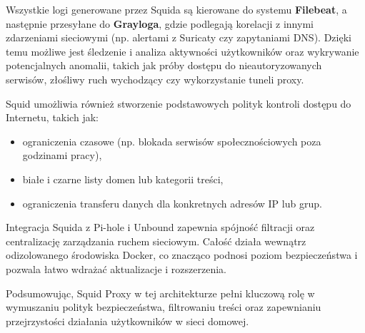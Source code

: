 \documentclass[
    left=2.5cm,         %
    right=2.5cm,        %
    top=2.5cm,          %
    bottom=3cm,         %
    bindingoffset=6mm,  %
    nohyphenation=true %
]{eiti/eiti-thesis} %
\begin{document}
Wszystkie logi generowane przez Squida są kierowane do systemu \textbf{Filebeat}, a następnie przesyłane do \textbf{Grayloga}, gdzie podlegają korelacji z innymi zdarzeniami sieciowymi (np. alertami z Suricaty czy zapytaniami DNS). Dzięki temu możliwe jest śledzenie i analiza aktywności użytkowników oraz wykrywanie potencjalnych anomalii, takich jak próby dostępu do nieautoryzowanych serwisów, złośliwy ruch wychodzący czy wykorzystanie tuneli proxy.

Squid umożliwia również stworzenie podstawowych polityk kontroli dostępu do Internetu, takich jak:
\begin{itemize}
    \item ograniczenia czasowe (np. blokada serwisów społecznościowych poza godzinami pracy),
    \item białe i czarne listy domen lub kategorii treści,
    \item ograniczenia transferu danych dla konkretnych adresów IP lub grup.
\end{itemize}

Integracja Squida z Pi-hole i Unbound zapewnia spójność filtracji oraz centralizację zarządzania ruchem sieciowym. Całość działa wewnątrz odizolowanego środowiska Docker, co znacząco podnosi poziom bezpieczeństwa i pozwala łatwo wdrażać aktualizacje i rozszerzenia.

Podsumowując, Squid Proxy w tej architekturze pełni kluczową rolę w wymuszaniu polityk bezpieczeństwa, filtrowaniu treści oraz zapewnianiu przejrzystości działania użytkowników w sieci domowej.
\end{document}
